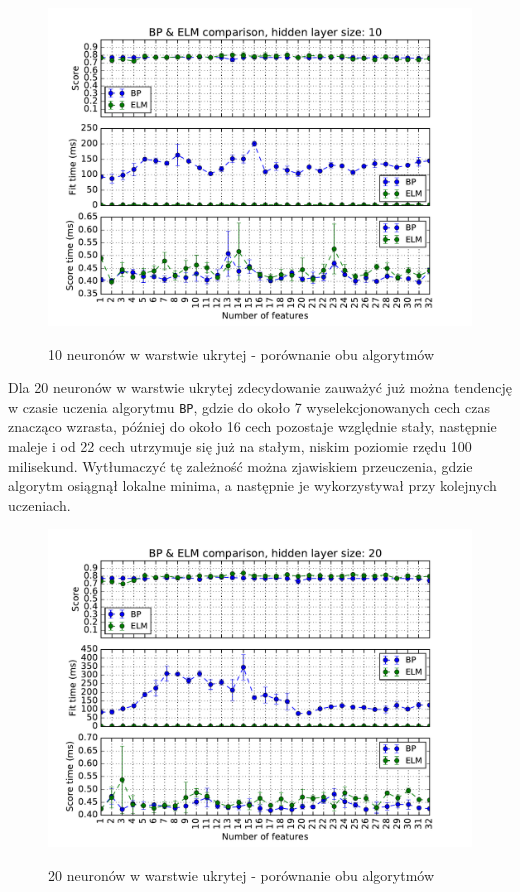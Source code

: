 \begin{figure}[h!]
	\centering
	\includegraphics[width=1.0\linewidth]{img/bp_elm_10.pdf}
	\label{Rysunek}
	\caption{10 neuronów w warstwie ukrytej - porównanie obu algorytmów}
\end{figure}

\newpage

Dla 20 neuronów w warstwie ukrytej zdecydowanie zauważyć już można tendencję w czasie uczenia algorytmu \texttt{BP}, gdzie do około 7 wyselekcjonowanych cech czas znacząco wzrasta, później do około 16 cech pozostaje względnie stały, następnie maleje i od 22 cech utrzymuje się już na stałym, niskim poziomie rzędu 100 milisekund. Wytłumaczyć tę zależność można zjawiskiem przeuczenia, gdzie algorytm osiągnął lokalne minima, a następnie je wykorzystywał przy kolejnych uczeniach.

\begin{figure}[h!]
	\centering
	\includegraphics[width=1.0\linewidth]{img/bp_elm_20.pdf}
	\label{Rysunek}
	\caption{20 neuronów w warstwie ukrytej - porównanie obu algorytmów}
\end{figure}

